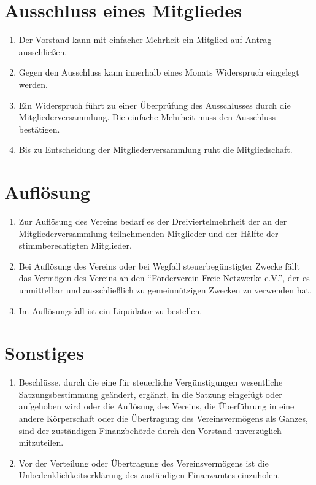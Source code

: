 \documentclass[ngerman]{article}
\begin{document}
\section{Ausschluss eines Mitgliedes}
\begin{enumerate}
  \item Der Vorstand kann mit einfacher Mehrheit ein Mitglied auf Antrag ausschließen.
  \item Gegen den Ausschluss kann innerhalb eines Monats Widerspruch eingelegt werden.
  \item Ein Widerspruch führt zu einer Überprüfung des Ausschlusses durch die Mitgliederversammlung. Die einfache Mehrheit muss den Ausschluss bestätigen.
  \item Bis zu Entscheidung der Mitgliederversammlung ruht die Mitgliedschaft.
\end{enumerate}


\section{Auflösung}
\begin{enumerate}
  \item Zur Auflösung des Vereins bedarf es der Dreiviertelmehrheit der an der Mitgliederversammlung teilnehmenden Mitglieder und der Hälfte der stimmberechtigten Mitglieder.
  \item Bei Auflösung des Vereins oder bei Wegfall steuerbegünstigter Zwecke fällt das Vermögen des Vereins an den "`Förderverein Freie Netzwerke e.V."', der es unmittelbar und ausschließlich zu gemeinnützigen Zwecken zu verwenden hat.
  \item Im Auflösungsfall ist ein Liquidator zu bestellen.
\end{enumerate}


\section{Sonstiges}
\begin{enumerate}
  \item Beschlüsse, durch die eine für steuerliche Vergünstigungen wesentliche Satzungsbestimmung geändert, ergänzt, in die Satzung eingefügt oder aufgehoben wird oder die Auflösung des Vereins, die Überführung in eine andere Körperschaft oder die Übertragung des Vereinsvermögens als Ganzes, sind der zuständigen Finanzbehörde durch den Vorstand unverzüglich mitzuteilen.
  \item Vor der Verteilung oder Übertragung des Vereinsvermögens ist die Unbedenklichkeitserklärung des zuständigen Finanzamtes einzuholen.
\end{enumerate}
\end{document}
